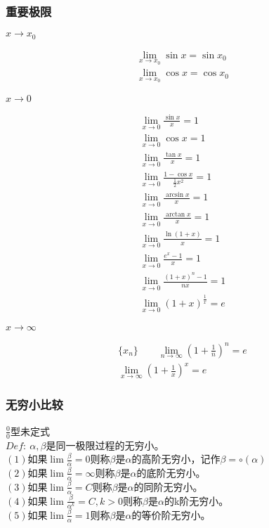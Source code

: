 \subsubsection{重要极限}
\vspace{-4mm}
\centerline{$x\rightarrow x_0$}
\vspace{-7mm}
\begin{align}
    \lim\limits_{x\to x_0}\sin x=\sin x_0 \label{limit_3_1}\\
    \lim\limits_{x\to x_0}\cos x=\cos x_0 \label{limit_3_2}
\end{align}
\centerline{$x\rightarrow 0$}
\begin{align}
    \lim\limits_{x\to 0}\frac{\sin x}{x}=1 \label{limit_1_1}\\
    \lim\limits_{x\to 0}\cos x=1 \label{limit_1_2}\\
    \lim\limits_{x\to 0}\frac{\tan x}{x}=1 \label{limit_1_3}\\
    \lim\limits_{x\to 0}\frac{1-\cos x}{\frac{1}{2}x^2}=1 \label{limit_1_4}\\
    \lim\limits_{x\to 0}\frac{\arcsin x}{x}=1 \label{limit_1_5}\\
    \lim\limits_{x\to 0}\frac{\arctan x}{x}=1 \label{limit_1_6}\\
    \lim\limits_{x\to 0}\frac{\ln \left(1+x\right)}{x}=1 \label{limit_1_7}\\
    \lim\limits_{x\to 0}\frac{e^x-1}{x}=1 \label{limit_1_8}\\
    \lim\limits_{x\to 0}\frac{\left(1+x\right)^n-1}{nx}=1 \label{limit_1_9}\\
    \lim\limits_{x\to 0}\left(1+x\right)^\frac{1}{x}=e \label{limit_1_10}
\end{align}
\centerline{$x\rightarrow \infty$}
\begin{align}
    \{x_n\}\qquad\lim\limits_{n\to \infty}\left(1+\frac{1}{n}\right)^n=e \label{limit_2_1}\\
    \lim\limits_{x\to \infty}\left(1+\frac{1}{x}\right)^x=e \label{limit_2_2}
\end{align}
\subsubsection{无穷小比较}
$\frac{0}{0}$型未定式\\
$Def:\ \alpha,\beta$是同一极限过程的无穷小。\\
$\left(1\right)$如果$\lim\frac{\beta}{\alpha}=0$则称$\beta$是$\alpha$的高阶无穷小，记作$\beta=\circ \left(\alpha\right)$\\
$\left(2\right)$如果$\lim\frac{\beta}{\alpha}=\infty$则称$\beta$是$\alpha$的底阶无穷小。\\
$\left(3\right)$如果$\lim\frac{\beta}{\alpha}=C$则称$\beta$是$\alpha$的同阶无穷小。\\
$\left(4\right)$如果$\lim\frac{\beta}{\alpha^k}=C,k>0$则称$\beta$是$\alpha$的k阶无穷小。\\
$\left(5\right)$如果$\lim\frac{\beta}{\alpha}=1$则称$\beta$是$\alpha$的等价阶无穷小。
